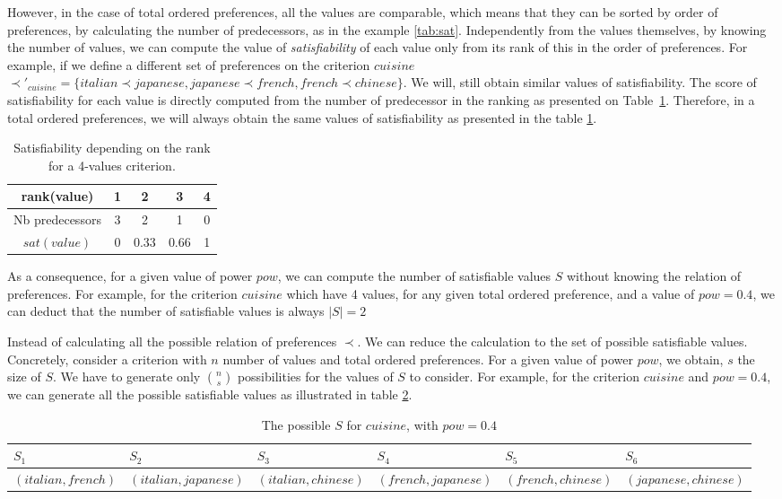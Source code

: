 \documentclass[conference, letterpaper]{IEEEtran}
\begin{document}
		However, in the case of total ordered preferences, all the values are comparable, which means that they can be sorted by order of preferences, by calculating the number of predecessors, as in the example \ref{tab:sat}. Independently from the values themselves, by knowing the number of values, we can compute the value of \emph{satisfiability} of each value only from its rank of this in the order of preferences. For example, if we define a different set of preferences  on the criterion $cuisine$ $\prec'_{cuisine} = \{italian \prec japanese, japanese \prec french, french \prec chinese\}$. We will, still obtain similar values of satisfiability. The score of satisfiability for each value is directly computed from the number of predecessor in the ranking as presented on Table~\ref{tab:poss}. Therefore, in a total ordered preferences, we will always obtain the same values of satisfiability as presented in the table \ref{tab:poss}. 
	\begin{table}[h]
		\caption{Satisfiability depending on the rank for a 4-values criterion.}
		\label{tab:poss}
		\centering
		\begin{tabular}{ |c|c|c|c|c| }
			\hline				
			rank(value) & 1 & 2 & 3 & 4 \\
			\hline
			Nb predecessors & 3 & 2 & 1& 0 \\
			\hline
			$sat(value)$ & 0 & 0.33 & 0.66 &1 \\
			\hline
		\end{tabular}
	\end{table}
	
	As a consequence, for a given value of power $pow$, we can compute the number of satisfiable values $S$ without knowing the relation of preferences. For example, for the criterion $cuisine$ which have 4 values, for any given total ordered preference, and a value of $pow = 0.4$, we can deduct that the number of satisfiable values is always $|S| = 2$
	
	Instead of calculating all the possible relation of preferences $\prec$. We can reduce the calculation to the set of possible satisfiable values.  Concretely, consider a criterion with $n$ number of values and total ordered preferences. For a given value of power $pow$, we obtain, $s$  the size of $S$. We have to generate only $\binom{n}{s}$ possibilities for the values of $S$ to consider. For example, for the criterion $cuisine$ and $pow =0.4$, we can generate all the possible satisfiable values as illustrated in table \ref{tab:sat_poss}.
		\begin{table}[h]
			\centering
			\caption{The possible $S$ for $cuisine$, with $pow=0.4$}
			\label{tab:sat_poss}

			\begin{tabular}{|p{1.9cm}|p{2.25cm}|p{2cm}|p{2.25cm}|p{2cm}|p{2.25cm}| }
				\hline				
				 $S_1$ & $S_2$ & $S_3$ & $S_4$ & $S_5$ & $S_6$ \\
				\hline$(italian,french)$& $(italian,japanese)$ & $(italian,chinese)$ & $(french,japanese)$ & $(french,chinese)$ & $(japanese,chinese)$ \\
				\hline
			\end{tabular}
		\end{table}
	
\end{document}
